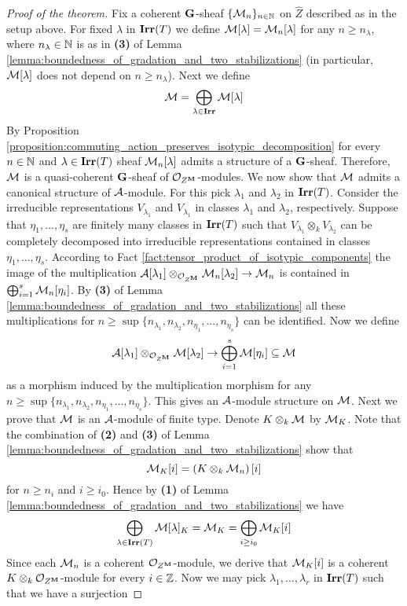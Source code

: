 \begin{proof}[Proof of the theorem]
Fix a coherent $\mathbf{G}$-sheaf $\{{\mathcal M}_n\}_{n\in {\mathbb N}}$ on $\widehat{Z}$ described as in the setup above. For fixed $\lambda$ in $\mathbf{Irr}(T)$ we define ${\mathcal M}[\lambda] = {\mathcal M}_n[\lambda]$ for any $n\geq n_{\lambda}$, where $n_{\lambda}\in {\mathbb N}$ is as in \textbf{(3)} of Lemma \ref{lemma:boundedness_of_gradation_and_two_stabilizations} (in particular, ${\mathcal M}[\lambda]$ does not depend on $n\geq n_{\lambda}$). Next we define
$${\mathcal M} = \bigoplus_{\lambda\in \mathbf{Irr}}{\mathcal M}[\lambda]$$
By Proposition \ref{proposition:commuting_action_preserves_isotypic_decomposition} for every $n\in {\mathbb N}$ and $\lambda \in \mathbf{Irr}(T)$ sheaf ${\mathcal M}_n[\lambda]$ admits a structure of a $\mathbf{G}$-sheaf. Therefore, ${\mathcal M}$ is a quasi-coherent $\mathbf{G}$-sheaf of ${\mathcal O}_{Z^{\mathbf{M}}}$-modules. We now show that ${\mathcal M}$ admits a canonical structure of ${\mathcal A}$-module. For this pick $\lambda_1$ and $\lambda_2$ in $\mathbf{Irr}(T)$. Consider the irreducible representations $V_{\lambda_1}$ and $V_{\lambda_1}$ in classes $\lambda_1$ and $\lambda_2$, respectively. Suppose that $\eta_1,...,\eta_s$ are finitely many classes in $\mathbf{Irr}(T)$ such that $V_{\lambda_1}\otimes_k V_{\lambda_2}$ can be completely decomposed into irreducible representations contained in classes $\eta_1,...,\eta_s$. According to Fact \ref{fact:tensor_product_of_isotypic_components} the image of the multiplication ${\mathcal A}[\lambda_1]\otimes_{{\mathcal O}_{Z^{\mathbf{M}}}}{\mathcal M}_n[\lambda_2]\rightarrow {\mathcal M}_n$ is contained in $\bigoplus_{i=1}^s{\mathcal M}_n[\eta_i]$. By \textbf{(3)} of Lemma \ref{lemma:boundedness_of_gradation_and_two_stabilizations} all these multiplications for $n\geq \sup \{n_{\lambda_1},n_{\lambda_2},n_{\eta_1},...,n_{\eta_s}\}$ can be identified. Now we define
$${\mathcal A}[\lambda_1]\otimes_{{\mathcal O}_{Z^{\mathbf{M}}}} {\mathcal M}[\lambda_2]\rightarrow  \bigoplus_{i=1}^s{\mathcal M}[\eta_i]\subseteq {\mathcal M}$$
as a morphism induced by the multiplication morphism for any $n\geq \sup\{n_{\lambda_1},n_{\lambda_2},n_{\eta_1},...,n_{\eta_s}\}$. This gives an ${\mathcal A}$-module structure on ${\mathcal M}$. Next we prove that ${\mathcal M}$ is an ${\mathcal A}$-module of finite type. Denote $K\otimes_k{\mathcal M}$ by ${\mathcal M}_K$. Note that the combination of \textbf{(2)} and \textbf{(3)} of Lemma \ref{lemma:boundedness_of_gradation_and_two_stabilizations} show that
$${\mathcal M}_K[i] = \left(K\otimes_k{\mathcal M}_n\right)[i]$$
for $n\geq n_i$ and $i\geq i_0$. Hence by \textbf{(1)} of Lemma \ref{lemma:boundedness_of_gradation_and_two_stabilizations} we have
$$\bigoplus_{\lambda\in \mathbf{Irr}(T)}{\mathcal M}[\lambda]_K = {\mathcal M}_K = \bigoplus_{i\geq i_0}{\mathcal M}_K[i]$$
Since each ${\mathcal M}_n$ is a coherent ${\mathcal O}_{Z^{\mathbf{M}}}$-module, we derive that ${\mathcal M}_K[i]$ is a coherent $K\otimes_k{\mathcal O}_{Z^{\mathbf{M}}}$-module for every $i\in {\mathbb Z}$. Now we may pick $\lambda_1,...,\lambda_r$ in $\mathbf{Irr}(T)$ such that we have a surjection

\end{proof}
